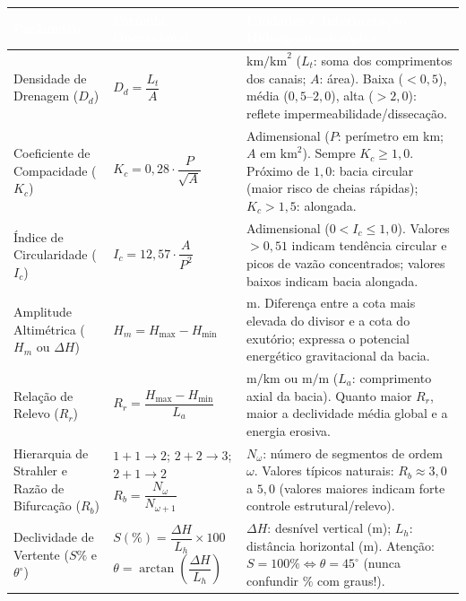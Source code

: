 \begin{center}
\renewcommand{\arraystretch}{1.30}
\small
\begin{tabularx}{\textwidth}{@{}p{3.3cm} p{4.5cm} >{\raggedright\arraybackslash}X@{}}
  \toprule
  \rowcolor{uefsNavy}
  \textcolor{white}{\bfseries Parâmetro} & \textcolor{white}{\bfseries Fórmula Operacional} & \textcolor{white}{\bfseries Unidades e Interpretação Hidrogeomorfológica} \\
  \midrule
  Densidade de Drenagem ($D_d$) & $D_d = \dfrac{L_t}{A}$ & $\text{km/km}^2$ ($L_t$: soma dos comprimentos dos canais; $A$: área). Baixa ($< 0,5$), média ($0,5$--$2,0$), alta ($> 2,0$): reflete impermeabilidade/dissecação. \\
  \rowcolor{bgGray}
  Coeficiente de Compacidade ($K_c$) & $K_c = 0,28 \cdot \dfrac{P}{\sqrt{A}}$ & Adimensional ($P$: perímetro em km; $A$ em $\text{km}^2$). Sempre $K_c \ge 1,0$. Próximo de $1,0$: bacia circular (maior risco de cheias rápidas); $K_c > 1,5$: alongada. \\
  Índice de Circularidade ($I_c$) & $I_c = 12,57 \cdot \dfrac{A}{P^2}$ & Adimensional ($0 < I_c \le 1,0$). Valores $> 0,51$ indicam tendência circular e picos de vazão concentrados; valores baixos indicam bacia alongada. \\
  \rowcolor{bgGray}
  Amplitude Altimétrica ($H_m$ ou $\Delta H$) & $H_m = H_{\max} - H_{\min}$ & $\text{m}$. Diferença entre a cota mais elevada do divisor e a cota do exutório; expressa o potencial energético gravitacional da bacia. \\
  Relação de Relevo ($R_r$) & $R_r = \dfrac{H_{\max} - H_{\min}}{L_a}$ & $\text{m/km}$ ou $\text{m/m}$ ($L_a$: comprimento axial da bacia). Quanto maior $R_r$, maior a declividade média global e a energia erosiva. \\
  \rowcolor{bgGray}
  Hierarquia de Strahler e Razão de Bifurcação ($R_b$) & $1+1\to 2$; $2+2\to 3$; $2+1\to 2$ \newline $R_b = \dfrac{N_\omega}{N_{\omega+1}}$ & $N_\omega$: número de segmentos de ordem $\omega$. Valores típicos naturais: $R_b \approx 3,0$ a $5,0$ (valores maiores indicam forte controle estrutural/relevo). \\
  Declividade de Vertente ($S\%$ e $\theta^\circ$) & $S(\%) = \dfrac{\Delta H}{L_h}\times 100$ \newline $\theta = \arctan\!\left(\dfrac{\Delta H}{L_h}\right)$ & $\Delta H$: desnível vertical (m); $L_h$: distância horizontal (m). Atenção: $S = 100\% \iff \theta = 45^\circ$ (nunca confundir $\%$ com graus!). \\
  \bottomrule
\end{tabularx}
\end{center}

